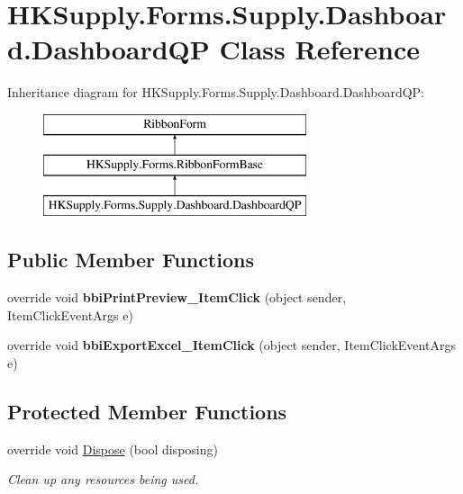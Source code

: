 \hypertarget{class_h_k_supply_1_1_forms_1_1_supply_1_1_dashboard_1_1_dashboard_q_p}{}\section{H\+K\+Supply.\+Forms.\+Supply.\+Dashboard.\+Dashboard\+QP Class Reference}
\label{class_h_k_supply_1_1_forms_1_1_supply_1_1_dashboard_1_1_dashboard_q_p}
Inheritance diagram for H\+K\+Supply.\+Forms.\+Supply.\+Dashboard.\+Dashboard\+QP\+:\begin{figure}[H]
\begin{center}
\leavevmode
\includegraphics[height=3.000000cm]{class_h_k_supply_1_1_forms_1_1_supply_1_1_dashboard_1_1_dashboard_q_p}
\end{center}
\end{figure}
\subsection*{Public Member Functions}
\begin{DoxyCompactItemize}
\item 
\mbox{\label{class_h_k_supply_1_1_forms_1_1_supply_1_1_dashboard_1_1_dashboard_q_p_a639021caf4c7c42056b3557f5feb1f55}} 
override void {\bfseries bbi\+Print\+Preview\+\_\+\+Item\+Click} (object sender, Item\+Click\+Event\+Args e)
\item 
\mbox{\label{class_h_k_supply_1_1_forms_1_1_supply_1_1_dashboard_1_1_dashboard_q_p_a840ebdb92f22e16c3e002fb40e8d130d}} 
override void {\bfseries bbi\+Export\+Excel\+\_\+\+Item\+Click} (object sender, Item\+Click\+Event\+Args e)
\end{DoxyCompactItemize}
\subsection*{Protected Member Functions}
\begin{DoxyCompactItemize}
\item 
override void \mbox{\hyperlink{class_h_k_supply_1_1_forms_1_1_supply_1_1_dashboard_1_1_dashboard_q_p_ae3aa524d36c9c7f15f57a32890c076c3}{Dispose}} (bool disposing)
\begin{DoxyCompactList}\small\item\em Clean up any resources being used. \end{DoxyCompactList}\end{DoxyCompactItemize}
